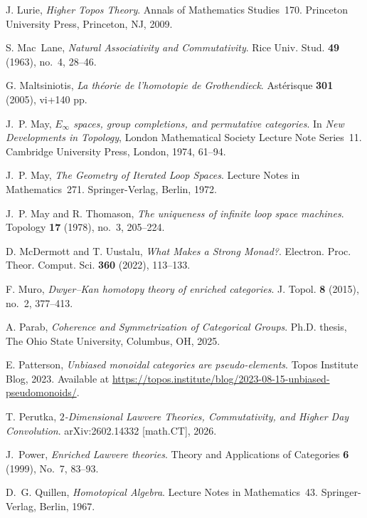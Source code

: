 \documentclass{tac}
\begin{document}
\begin{references*}
J. Lurie,
\emph{Higher Topos Theory}.
Annals of Mathematics Studies~170.
Princeton University Press, Princeton, NJ, 2009.

S. Mac~Lane,
\emph{Natural Associativity and Commutativity}.
Rice Univ. Stud. \textbf{49} (1963), no.~4, 28--46.

G. Maltsiniotis,
\emph{La th\'eorie de l'homotopie de Grothendieck}.
Ast\'erisque \textbf{301} (2005), vi+140 pp.

J.~P. May,
\emph{$E_\infty$ spaces, group completions, and permutative categories}.
In \emph{New Developments in Topology},
London Mathematical Society Lecture Note Series~11.
Cambridge University Press, London, 1974, 61--94.

J.~P. May,
\emph{The Geometry of Iterated Loop Spaces}.
Lecture Notes in Mathematics~271.
Springer-Verlag, Berlin, 1972.

J.~P. May and R. Thomason,
\emph{The uniqueness of infinite loop space machines}.
Topology \textbf{17} (1978), no.~3, 205--224.

D. McDermott and T. Uustalu,
\emph{What Makes a Strong Monad?}.
Electron. Proc. Theor. Comput. Sci. \textbf{360} (2022), 113--133.

F. Muro,
\emph{Dwyer--Kan homotopy theory of enriched categories}.
J. Topol. \textbf{8} (2015), no.~2, 377--413.

A. Parab,
\emph{Coherence and Symmetrization of Categorical Groups}.
Ph.D. thesis, The Ohio State University, Columbus, OH, 2025.

E. Patterson,
\emph{Unbiased monoidal categories are pseudo-elements}.
Topos Institute Blog, 2023.
Available at \url{https://topos.institute/blog/2023-08-15-unbiased-pseudomonoids/}.

T. Perutka,
\emph{$2$-Dimensional Lawvere Theories, Commutativity, and Higher Day Convolution}.
arXiv:2602.14332 [math.CT], 2026.

J.~Power,
\emph{Enriched Lawvere theories}.
Theory and Applications of Categories \textbf{6} (1999), No.~7, 83--93.

D.~G. Quillen,
\emph{Homotopical Algebra}.
Lecture Notes in Mathematics~43.
Springer-Verlag, Berlin, 1967.


\end{references*}
\end{document}
